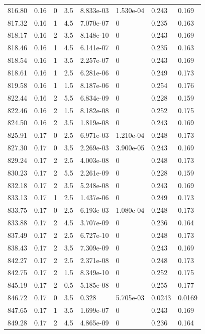 \documentclass[preview]{standalone}
\begin{document}
{{{{{{{{{{{{{{\begin{tabular}{L{1.2cm}C{1.2cm} C{0.3cm}C{0.5cm} C{1.4cm}C{1.4cm} C{1.4cm}C{1.4cm}}
  816.80  &  0.16  & 0     & 3.5 &  8.833e-03  & 1.530e-04  & 0.243 &  0.169   \\ 
  817.32  &  0.16  & 1     & 4.5 &  7.070e-07  & 0  & 0.235 &  0.163   \\ 
  818.17  &  0.16  & 2     & 3.5 &  8.148e-10  & 0  & 0.243 &  0.169   \\ 
  818.46  &  0.16  & 1     & 4.5 &  6.141e-07  & 0  & 0.235 &  0.163   \\ 
  818.54  &  0.16  & 1     & 3.5 &  2.257e-07  & 0  & 0.243 &  0.169   \\ 
  818.61  &  0.16  & 1     & 2.5 &  6.281e-06  & 0  & 0.249 &  0.173   \\ 
  819.58  &  0.16  & 1     & 1.5 &  8.187e-06  & 0  & 0.254 &  0.176   \\ 
  822.44  &  0.16  & 2     & 5.5 &  6.834e-09  & 0  & 0.228 &  0.159   \\ 
  822.46  &  0.16  & 2     & 1.5 &  8.182e-08  & 0  & 0.252 &  0.175   \\ 
  824.50  &  0.16  & 2     & 3.5 &  1.819e-08  & 0  & 0.243 &  0.169   \\ 
  825.91  &  0.17  & 0     & 2.5 &  6.971e-03  & 1.210e-04  & 0.248 &  0.173   \\ 
  827.30  &  0.17  & 0     & 3.5 &  2.269e-03  & 3.900e-05  & 0.243 &  0.169   \\ 
  829.24  &  0.17  & 2     & 2.5 &  4.003e-08  & 0  & 0.248 &  0.173   \\ 
  830.23  &  0.17  & 2     & 5.5 &  2.261e-09  & 0  & 0.228 &  0.159   \\ 
  832.18  &  0.17  & 2     & 3.5 &  5.248e-08  & 0  & 0.243 &  0.169   \\ 
  833.13  &  0.17  & 1     & 2.5 &  1.437e-06  & 0  & 0.249 &  0.173   \\ 
  833.75  &  0.17  & 0     & 2.5 &  6.193e-03  & 1.080e-04  & 0.248 &  0.173   \\ 
  833.88  &  0.17  & 2     & 4.5 &  3.707e-09  & 0  & 0.236 &  0.164   \\ 
  837.49  &  0.17  & 2     & 2.5 &  6.727e-10  & 0  & 0.248 &  0.173   \\ 
  838.43  &  0.17  & 2     & 3.5 &  7.309e-09  & 0  & 0.243 &  0.169   \\ 
  842.27  &  0.17  & 2     & 2.5 &  2.371e-08  & 0  & 0.248 &  0.173   \\ 
  842.75  &  0.17  & 2     & 1.5 &  8.349e-10  & 0  & 0.252 &  0.175   \\ 
  845.19  &  0.17  & 2     & 0.5 &  5.185e-08  & 0  & 0.255 &  0.177   \\ 
  846.72  &  0.17  & 0     & 3.5 &  0.328  & 5.705e-03  & 0.0243 &  0.0169   \\ 
  847.65  &  0.17  & 1     & 3.5 &  1.699e-07  & 0  & 0.243 &  0.169   \\ 
  849.28  &  0.17  & 2     & 4.5 &  4.865e-09  & 0  & 0.236 &  0.164   \\ 
\hline 
\end{tabular} 

}}}}}}}}}}}}}}
\end{document}

